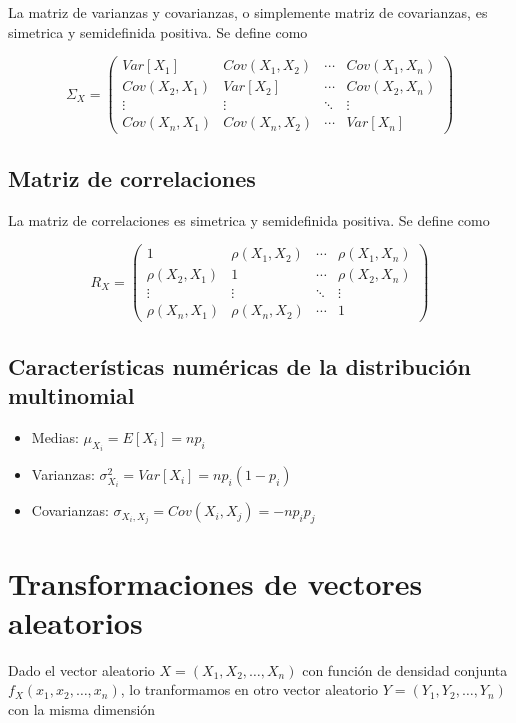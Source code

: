 \documentclass{article}
\begin{document}
La matriz de varianzas y covarianzas, o simplemente matriz de covarianzas, es simetrica y semidefinida positiva. Se define como

\[ \Sigma_{X} = \left( \begin{matrix}
        Var[X_1] & Cov(X_1, X_2) & \cdots & Cov(X_1, X_n) \\
        Cov(X_2, X_1) & Var[X_2] & \cdots & Cov(X_2, X_n) \\
        \vdots & \vdots & \ddots & \vdots \\
        Cov(X_n, X_1) & Cov(X_n, X_2) & \cdots & Var[X_n]
\end{matrix} \right) \]

\subsection{Matriz de correlaciones}

La matriz de correlaciones es simetrica y semidefinida positiva. Se define como

\[ R_{X} = \left( \begin{matrix}
        1 & \rho(X_1, X_2) & \cdots & \rho(X_1, X_n) \\
        \rho(X_2, X_1) & 1 & \cdots & \rho(X_2, X_n) \\
        \vdots & \vdots & \ddots & \vdots \\
        \rho(X_n, X_1) & \rho(X_n, X_2) & \cdots & 1
\end{matrix} \right) \]

\subsection{Características numéricas de la distribución multinomial}

\begin{itemize}
    \item Medias: $\mu_{X_i} = E[X_i] = np_i$
    \item Varianzas: $\sigma_{X_i}^2 = Var[X_i] = np_i(1 - p_i)$
    \item Covarianzas: $\sigma_{X_i, X_j} = Cov(X_i, X_j) = -np_ip_j$
\end{itemize}


\section{Transformaciones de vectores aleatorios}


Dado el vector aleatorio $X = (X_1, X_2, \dots, X_n)$ con función de densidad conjunta $f_X(x_1, x_2, \dots, x_n)$, lo tranformamos
en otro vector aleatorio $Y = (Y_1, Y_2, \dots, Y_n)$ con la misma dimensión
\end{document}
